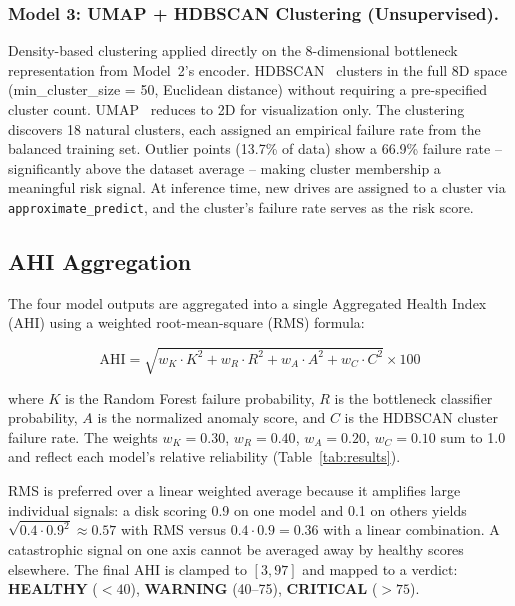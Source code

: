 \documentclass[sigconf,natbib=false, language=english]{acmart}
\begin{document}
\subsubsection{Model 3: UMAP + HDBSCAN Clustering (Unsupervised).}
Density-based clustering applied directly on the 8-dimensional bottleneck representation from Model~2's encoder. HDBSCAN~\cite{campello2013hdbscan,mcinnes2017hdbscan} clusters in the full 8D space (min\_cluster\_size = 50, Euclidean distance) without requiring a pre-specified cluster count. UMAP~\cite{mcinnes2018umap} reduces to 2D for visualization only. The clustering discovers 18 natural clusters, each assigned an empirical failure rate from the balanced training set. Outlier points (13.7\% of data) show a 66.9\% failure rate -- significantly above the dataset average -- making cluster membership a meaningful risk signal. At inference time, new drives are assigned to a cluster via \texttt{approximate\_predict}, and the cluster's failure rate serves as the risk score.

\subsection{AHI Aggregation}
\label{sec:ahi}

The four model outputs are aggregated into a single Aggregated Health Index (AHI) using a weighted root-mean-square (RMS) formula:

\begin{equation}
\text{AHI} = \sqrt{w_K \cdot K^2 + w_R \cdot R^2 + w_A \cdot A^2 + w_C \cdot C^2} \times 100
\label{eq:ahi}
\end{equation}

where $K$ is the Random Forest failure probability, $R$ is the bottleneck classifier probability, $A$ is the normalized anomaly score, and $C$ is the HDBSCAN cluster failure rate. The weights $w_K = 0.30$, $w_R = 0.40$, $w_A = 0.20$, $w_C = 0.10$ sum to 1.0 and reflect each model's relative reliability (Table~\ref{tab:results}).

RMS is preferred over a linear weighted average because it amplifies large individual signals: a disk scoring 0.9 on one model and 0.1 on others yields $\sqrt{0.4 \cdot 0.9^2} \approx 0.57$ with RMS versus $0.4 \cdot 0.9 = 0.36$ with a linear combination. A catastrophic signal on one axis cannot be averaged away by healthy scores elsewhere. The final AHI is clamped to $[3, 97]$ and mapped to a verdict: \textbf{HEALTHY} ($<40$), \textbf{WARNING} (40--75), \textbf{CRITICAL} ($>75$).
\end{document}
